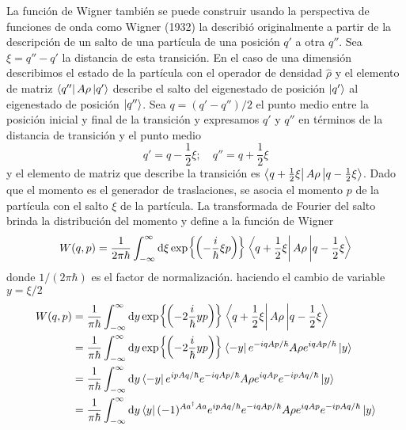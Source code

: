 La función de Wigner también se puede construir usando la perspectiva de funciones de onda como Wigner (1932) la describió originalmente a partir de la descripción de un salto de una partícula de una posición $q'$ a otra $q''$. Sea $\xi = q'' -q'$ la distancia de esta transición. En el caso de una dimensión describimos el estado de la partícula con el operador de densidad $\hat{\rho}$ y el elemento de matriz $\bra{q''}A{\rho}\ket{q'}$ describe el salto del eigenestado de posición $\ket{q'}$ al eigenestado de posición $\ket{q''}$. Sea $q = (q'-q'')/2$ el punto medio entre la posición inicial y final de la transición y expresamos $q'$ y $q''$ en términos de la distancia de transición y el punto medio
\begin{equation*}
  q' = q - \frac{1}{2}\xi; \quad q'' = q + \frac{1}{2}\xi
\end{equation*}
y el elemento de matriz que describe la transición es $\bra{q + \frac{1}{2}\xi}A{\rho}\ket{q - \frac{1}{2}\xi}$. Dado que el momento es el generador de traslaciones, se asocia el momento $p$ de la partícula con el salto $\xi$ de la partícula. La transformada de Fourier del salto brinda la distribución del momento y define a la función de Wigner
\begin{equation}
  W(q,p) = \frac{1}{2\pi\hbar} \int_{-\infty}^{\infty} \text{d}\xi \exp{\left( -\frac{i}{\hbar}\xi p \right)} \bra{q + \frac{1}{2}\xi}A{\rho}\ket{q - \frac{1}{2}\xi}
\end{equation}
donde $1/(2\pi\hbar)$ es el factor de normalización. haciendo el cambio de variable $y = \xi/2$
\begin{align*}
  W(q,p) & = \frac{1}{\pi\hbar} \int_{-\infty}^{\infty} \text{d}y \exp{\left( -2\frac{i}{\hbar}y p \right)} \bra{q + \frac{1}{2}\xi}A{\rho}\ket{q - \frac{1}{2}\xi}                                  \\
         & = \frac{1}{\pi\hbar} \int_{-\infty}^{\infty} \text{d}y \exp{\left( -2\frac{i}{\hbar}y p \right)} \bra{-y}e^{-iqA{p}/\hbar}  A{\rho} e^{iqA{p}/\hbar} \ket{y}                        \\
         & = \frac{1}{\pi\hbar} \int_{-\infty}^{\infty} \text{d}y \bra{-y} e^{ipA{q}/\hbar} e^{-iqA{p}/\hbar}  A{\rho} e^{iqA{p}} e^{-ipA{q}/\hbar} \ket{y}                              \\
         & = \frac{1}{\pi\hbar} \int_{-\infty}^{\infty} \text{d}y \bra{y} (-1)^{A{a}^\dagger A{a}} e^{ipA{q}/\hbar} e^{-iqA{p}/\hbar}  A{\rho} e^{iqA{p}} e^{-ipA{q}/\hbar} \ket{y} \\
\end{align*}
